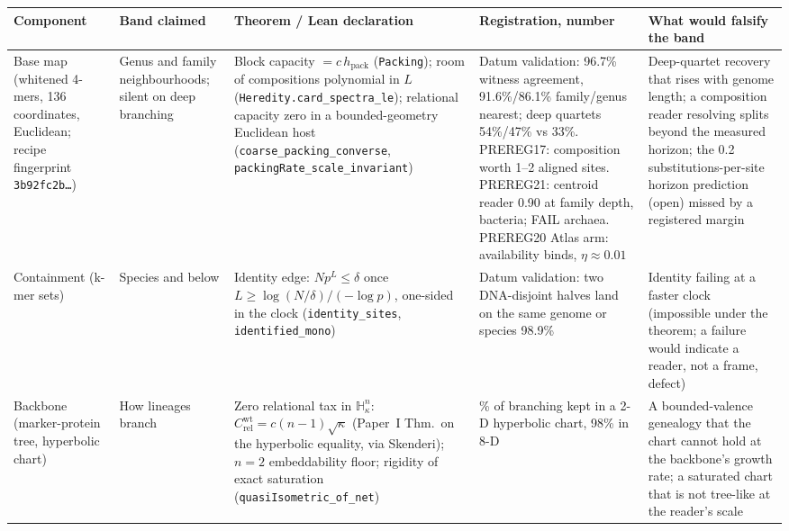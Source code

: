 \documentclass[10pt]{article}
\newcommand{\hpack}{h_{\mathrm{pack}}}
\begin{document}
\small
\begin{longtable}{@{}>{\raggedright\arraybackslash}p{2.6cm}>{\raggedright\arraybackslash}p{2.9cm}>{\raggedright\arraybackslash}p{4.2cm}>{\raggedright\arraybackslash}p{3.4cm}>{\raggedright\arraybackslash}p{3.4cm}@{}}
\toprule
\textbf{Component} & \textbf{Band claimed} & \textbf{Theorem / Lean declaration} & \textbf{Registration, number} & \textbf{What would falsify the band}\\
\midrule
\endhead
Base map (whitened 4-mers, 136 coordinates, Euclidean; recipe fingerprint \texttt{3b92fc2b\ldots}) & Genus and family neighbourhoods; silent on deep branching & Block capacity $=c\,\hpack$ (\texttt{Packing}); room of compositions polynomial in $L$ (\texttt{Heredity.card\_\allowbreak{}spectra\_\allowbreak{}le}); relational capacity zero in a bounded-geometry Euclidean host (\texttt{coarse\_\allowbreak{}packing\_\allowbreak{}converse}, \texttt{packingRate\_\allowbreak{}scale\_\allowbreak{}invariant}) & Datum validation: 96.7\% witness agreement, 91.6\%/86.1\% family/genus nearest; deep quartets 54\%/47\% vs 33\%. PREREG17: composition worth 1--2 aligned sites. PREREG21: centroid reader 0.90 at family depth, bacteria; FAIL archaea. PREREG20 Atlas arm: availability binds, $\eta\approx0.01$ & Deep-quartet recovery that rises with genome length; a composition reader resolving splits beyond the measured horizon; the 0.2 substitutions-per-site horizon prediction (open) missed by a registered margin\\
Containment (k-mer sets) & Species and below & Identity edge: $N p^L\le\delta$ once $L\ge\log(N/\delta)/(-\log p)$, one-sided in the clock (\texttt{identity\_\allowbreak{}sites}, \texttt{identified\_\allowbreak{}mono}) & Datum validation: two DNA-disjoint halves land on the same genome or species 98.9\% & Identity failing at a faster clock (impossible under the theorem; a failure would indicate a reader, not a frame, defect)\\
Backbone (marker-protein tree, hyperbolic chart) & How lineages branch & Zero relational tax in $\mathbb H^n_\kappa$: $C^{\mathrm{wt}}_{\mathrm{rel}}=c(n-1)\sqrt\kappa$ (Paper~I Thm.\ on the hyperbolic equality, via Skenderi); $n=2$ embeddability floor; rigidity of exact saturation (\texttt{quasiIsometric\_\allowbreak{}of\_\allowbreak{}net}) & 93\% of branching kept in a 2-D hyperbolic chart, 98\% in 8-D & A bounded-valence genealogy that the chart cannot hold at the backbone's growth rate; a saturated chart that is not tree-like at the reader's scale\\

\end{longtable}
\end{document}
